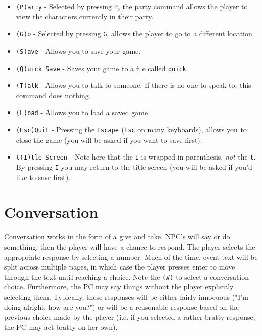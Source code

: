 \documentclass{report}
\begin{document}
    \begin{itemize}
    \item \verb|(P)arty| - Selected by pressing \verb|P|, the party command allows 
        the player to view the characters currently in their party.
    \item \verb|(G)o| - Selected by pressing \verb|G|, allows the player to go to
    a different location.
    \item \verb|(S)ave| - Allows you to save your game.
    \item \verb|(Q)uick Save| - Saves your game to a file called \verb|quick|.
    \item \verb|(T)alk| - Allows you to talk to someone. If there is no one to
        speak to, this command does nothing.
    \item \verb|(L)oad| - Allows you to load a saved game.
    \item \verb|(Esc)Quit| - Pressing the \verb|Escape| (\verb|Esc| on many 
    keyboards), allows you to close the game (you will be asked if you want to 
    save first).
    \item \verb|t(I)tle Screen| - Note here that the \verb|I| is wrapped in 
    parenthesis, \emph{not} the \verb|t|. By pressing \verb|I| you may return to
    the title screen (you will be asked if you'd like to save first).
    \end{itemize}

\section{Conversation}
\label{sec_conversation}

    Conversation works in the form of a give and take. NPC's will say or do something, then the player will have a chance to respond. The player selects the appropriate
    response by selecting a number. Much of the time, event text will be split across multiple pages, in which case the player presses enter to move through the text 
    until reaching a choice. Note the \verb|(#)| to select a conversation choice. Furthermore, the PC may say things without the player explicitly selecting them.
    Typically, these responses will be either fairly innocuous ("I'm doing alright, how are you?") or will be a reasonable response based on the previous choice made by the
    player (i.e. if you selected a rather bratty response, the PC may act bratty on her own). 
\end{document}
